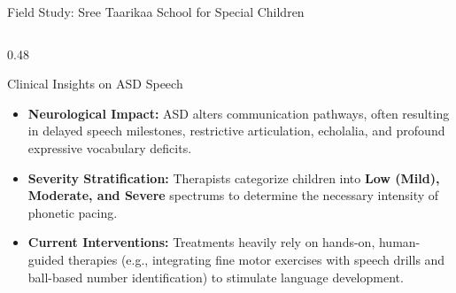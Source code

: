 \documentclass[aspectratio=169, 11pt, xcolor=table]{beamer}
\begin{document}
\begin{frame}{Field Study: Sree Taarikaa School for Special Children}
    \vspace{-4mm}
    \begin{columns}[T, totalwidth=\textwidth]

        \begin{column}{0.48\textwidth}
            \begin{block}{Clinical Insights on ASD Speech}
                \tiny
                \begin{itemize}
                    \setlength{\itemsep}{3pt}
                    \item \textbf{Neurological Impact:} ASD alters communication pathways, often resulting in delayed speech milestones, restrictive articulation, echolalia, and profound expressive vocabulary deficits.
                    \item \textbf{Severity Stratification:} Therapists categorize children into \textbf{Low (Mild), Moderate, and Severe} spectrums to determine the necessary intensity of phonetic pacing.
                    \item \textbf{Current Interventions:} Treatments heavily rely on hands-on, human-guided therapies (e.g., integrating fine motor exercises with speech drills and ball-based number identification) to stimulate language development.
                \end{itemize}
            \end{block}
        \end{column}


\end{columns}
\end{frame}
\end{document}
